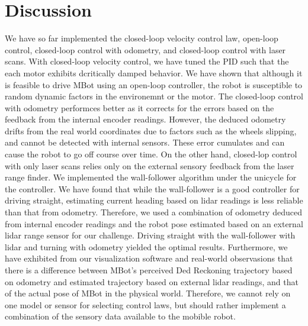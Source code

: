\documentclass[conference]{IEEEtran}
\begin{document}
\section{Discussion}
We have so far implemented the closed-loop velocity control law, open-loop control, closed-loop control with odometry, and closed-loop control with laser scans.
With closed-loop velocity control, we have tuned the PID such that the each motor exhibits dcritically damped behavior. We have shown that although it is feasible
to drive MBot using an open-loop controller, the robot is susceptible to random dynamic factors in the environemnt or the motor. The closed-loop control with odometry
performces better as it corrects for the errors based on the feedback from the internal encoder readings. However, the deduced odometry drifts from the real world 
coordinates due to factors such as the wheels slipping, and cannot be detected with internal sensors. These error cumulates and can cause the robot to go off course 
over time. On the other hand, closed-lop control with only laser scans relies only on the external sensory feedback from the laser range finder. We implemented the
wall-follower algorithm under the unicycle for the controller. We have found that while the wall-follower is a good controller for driving straight, estimating current
heading based on lidar readings is less reliable than that from odometry. Therefore, we used a combination of odometry deduced from internal encoder readings and the 
robot pose estimated based on an external lidar range sensor for our challenge. Driving straight with the wall-follower with lidar and turning with odometry yielded the 
optimal results. Furthermore, we have exhibited from our visualization software and real-world observasions that there is a difference between MBot's perceived Ded Reckoning
trajectory based on odometry and estimated trajectory based on external lidar readings, and that of the actual pose of MBot in the physical world. Therefore, we cannot rely
on one model or sensor for selecting control laws, but should rather implement a combination of the sensory data available to the mobible robot.


\appendix
\end{document}
